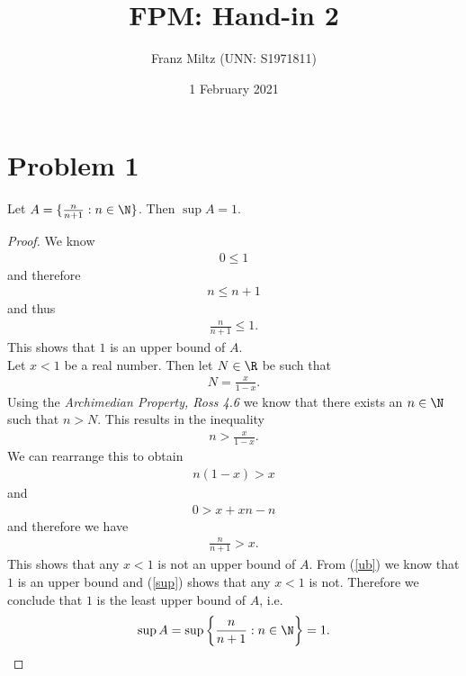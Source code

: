 \documentclass{article}
\begin{document}
\title{FPM: Hand-in 2}
\author{Franz Miltz (UNN: S1971811)}
\date{1 February 2021}
\maketitle

\section*{Problem 1}

\begin{claim*}
   Let $A=\{\frac{n}{n+1}:n\in\N\}$. Then $\sup A = 1$.
\end{claim*}
\begin{proof}
   We know
   \begin{align*}
      0 \leq 1
   \end{align*}
   and therefore
   \begin{align*}
      n \leq n + 1
   \end{align*}
   and thus
   \begin{align}
      \label{ub}
      \frac{n}{n+1}\leq 1.
   \end{align}
   This shows that $1$ is an upper bound of $A$.\\
   Let $x<1$ be a real number. Then let $N\in\R$ be such that
   \begin{align*}
      N = \frac{x}{1-x}.
   \end{align*}
   Using the \emph{Archimedian Property, Ross 4.6} we know that there exists
   an $n\in\N$ such that $n > N$. This results in the inequality
   \begin{align*}
      n > \frac{x}{1-x}.
   \end{align*}
   We can rearrange this to obtain
   \begin{align*}
      n(1-x) > x
   \end{align*}
   and
   \begin{align*}
      0 > x + xn - n
   \end{align*}
   and therefore we have
   \begin{align}
      \label{sup}
      \frac{n}{n+1} > x.
   \end{align}
   This shows that any $x<1$ is not an upper bound of $A$.
   From (\ref{ub}) we know that $1$ is an upper bound and (\ref{sup}) shows
   that any $x<1$ is not. Therefore we conclude that
   $1$ is the least upper bound of $A$, i.e.
   \begin{align*}
      \sup A = \sup\left\{\frac{n}{n+1}:n\in\N\right\} = 1.
   \end{align*}
\end{proof}
\end{document}
